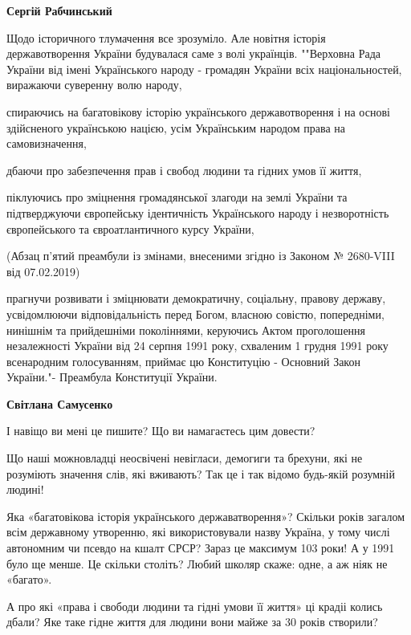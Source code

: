 \begin{itemize}
\begin{itemize}
\textbf{Сергій Рабчинський} 

Щодо історичного тлумачення все зрозуміло. Але новітня історія державотворення
України будувалася саме з волі українців. ""Верховна Рада України від імені
Українського народу - громадян України всіх національностей, виражаючи
суверенну волю народу,

спираючись на багатовікову історію українського державотворення і на основі
здійсненого українською нацією, усім Українським народом права на
самовизначення,

дбаючи про забезпечення прав і свобод людини та гідних умов її життя,

піклуючись про зміцнення громадянської злагоди на землі України та
підтверджуючи європейську ідентичність Українського народу і незворотність
європейського та євроатлантичного курсу України,

(Абзац п'ятий преамбули із змінами, внесеними згідно із Законом № 2680-VIII від 07.02.2019)

прагнучи розвивати і зміцнювати демократичну, соціальну, правову державу,
усвідомлюючи відповідальність перед Богом, власною совістю, попередніми,
нинішнім та прийдешніми поколіннями, керуючись Актом проголошення незалежності
України від 24 серпня 1991 року, схваленим 1 грудня 1991 року всенародним
голосуванням, приймає цю Конституцію - Основний Закон України."- Преамбула
Конституції України.

 
\textbf{Світлана Самусенко} 

І навіщо ви мені це пишите? Що ви намагаєтесь цим довести?

Що наші можновладці неосвічені невігласи, демогиги та брехуни, які не розуміють
значення слів, які вживають? Так це і так відомо будь-якій розумній людині!

Яка «багатовікова історія українського державатворення»? Скільки років загалом
всім державному утворенню, які використовували назву Україна, у тому числі
автономним чи псевдо на кшалт СРСР? Зараз це максимум 103 роки! А у 1991 було
ще менше. Це скільки століть? Любий школяр скаже: одне, а аж ніяк не «багато».

А про які «права і свободи людини та гідні умови її життя» ці крадіі колись
дбали? Яке таке гідне життя для людини вони майже за 30 років створили?


\end{itemize}
\end{itemize}
